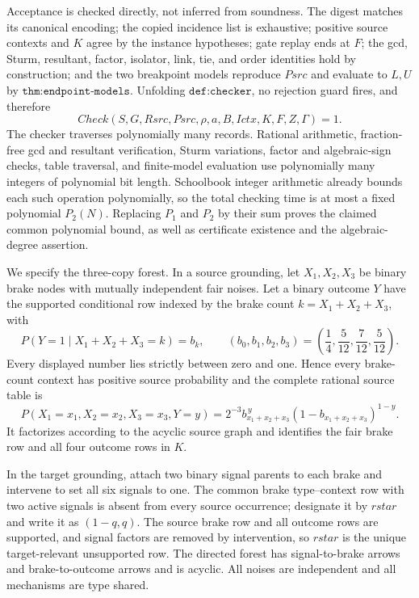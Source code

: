 Acceptance is checked directly, not inferred from soundness.  The digest matches its canonical encoding; the copied incidence list is exhaustive; positive source contexts and \(K\) agree by the instance hypotheses; gate replay ends at \(F\); the gcd, Sturm, resultant, factor, isolator, link, tie, and order identities hold by construction; and the two breakpoint models reproduce \(Psrc\) and evaluate to \(L,U\) by \(\texttt{thm:endpoint-models}\).  Unfolding \(\texttt{def:checker}\), no rejection guard fires, and therefore
\[
 Check(S,G,Rsrc,Psrc,\rho,a,B,Ictx,K,F,Z,\Gamma)=1.
\]
The checker traverses polynomially many records.  Rational arithmetic, fraction-free gcd and resultant verification, Sturm variations, factor and algebraic-sign checks, table traversal, and finite-model evaluation use polynomially many integers of polynomial bit length.  Schoolbook integer arithmetic already bounds each such operation polynomially, so the total checking time is at most a fixed polynomial \(P_2(N)\).  Replacing \(P_1\) and \(P_2\) by their sum proves the claimed common polynomial bound, as well as certificate existence and the algebraic-degree assertion.

We specify the three-copy forest.  In a source grounding, let \(X_1,X_2,X_3\) be binary brake nodes with mutually independent fair noises.  Let a binary outcome \(Y\) have the supported conditional row indexed by the brake count \(k=X_1+X_2+X_3\), with
\[
 P(Y=1\mid X_1+X_2+X_3=k)=b_k,
 \qquad
 (b_0,b_1,b_2,b_3)
 =\left(\frac14,\frac5{12},\frac7{12},\frac5{12}\right).
\]
Every displayed number lies strictly between zero and one.  Hence every brake-count context has positive source probability and the complete rational source table is
\[
 P(X_1=x_1,X_2=x_2,X_3=x_3,Y=y)
 =2^{-3}b_{x_1+x_2+x_3}^{\,y}
       (1-b_{x_1+x_2+x_3})^{1-y}.
\]
It factorizes according to the acyclic source graph and identifies the fair brake row and all four outcome rows in \(K\).

In the target grounding, attach two binary signal parents to each brake and intervene to set all six signals to one.  The common brake type--context row with two active signals is absent from every source occurrence; designate it by \(rstar\) and write it as \((1-q,q)\).  The source brake row and all outcome rows are supported, and signal factors are removed by intervention, so \(rstar\) is the unique target-relevant unsupported row.  The directed forest has signal-to-brake arrows and brake-to-outcome arrows and is acyclic.  All noises are independent and all mechanisms are type shared.

